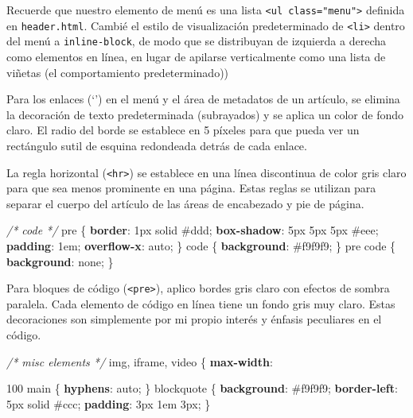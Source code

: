 \documentclass[12pt,]{krantz}
\makeatletter
\newenvironment{Shaded}{\begin{snugshade}}{\end{snugshade}}
\newcommand{\CommentTok}[1]{\textcolor[rgb]{0.56,0.35,0.01}{\textit{#1}}}
\newcommand{\DecValTok}[1]{\textcolor[rgb]{0.00,0.00,0.81}{#1}}
\newcommand{\KeywordTok}[1]{\textcolor[rgb]{0.13,0.29,0.53}{\textbf{#1}}}
\newcommand{\NormalTok}[1]{#1}
\newenvironment{kframe}{%
\medskip{}
\setlength{\fboxsep}{.8em}
 \def\at@end@of@kframe{}%
 \ifinner\ifhmode%
  \def\at@end@of@kframe{\end{minipage}}%
  \begin{minipage}{\columnwidth}%
 \fi\fi%
 \def\FrameCommand##1{\hskip\@totalleftmargin \hskip-\fboxsep
 \colorbox{shadecolor}{##1}\hskip-\fboxsep
     \hskip-\linewidth \hskip-\@totalleftmargin \hskip\columnwidth}%
 \MakeFramed {\advance\hsize-\width
   \@totalleftmargin\z@ \linewidth\hsize
   \@setminipage}}%
 {\par\unskip\endMakeFramed%
 \at@end@of@kframe}
\renewenvironment{Shaded}{\begin{kframe}}{\end{kframe}}
\theoremstyle{definition}
\theoremstyle{definition}
\theoremstyle{definition}
\theoremstyle{remark}
\makeatother
\begin{document}
\begin{itemize}
  Recuerde que nuestro elemento de menú es una lista
  \texttt{\textless{}ul\ class="menu"\textgreater{}} definida en
  \texttt{header.html}. Cambié el estilo de visualización predeterminado
  de \texttt{\textless{}li\textgreater{}} dentro del menú a
  \texttt{inline-block}, de modo que se distribuyan de izquierda a
  derecha como elementos en línea, en lugar de apilarse verticalmente
  como una lista de viñetas (el comportamiento predeterminado))

  Para los enlaces (`') en el menú y el área de metadatos de un
  artículo, se elimina la decoración de texto predeterminada
  (subrayados) y se aplica un color de fondo claro. El radio del borde
  se establece en 5 píxeles para que pueda ver un rectángulo sutil de
  esquina redondeada detrás de cada enlace.

  La regla horizontal (\texttt{\textless{}hr\textgreater{}}) se
  establece en una línea discontinua de color gris claro para que sea
  menos prominente en una página. Estas reglas se utilizan para separar
  el cuerpo del artículo de las áreas de encabezado y pie de página.

\begin{Shaded}
\begin{Highlighting}[]
\CommentTok{/* code */}
\NormalTok{pre \{}
  \KeywordTok{border}\NormalTok{: }\DecValTok{1px} \DecValTok{solid} \DecValTok{#ddd}\NormalTok{;}
  \KeywordTok{box-shadow}\NormalTok{: }\DecValTok{5px} \DecValTok{5px} \DecValTok{5px} \DecValTok{#eee}\NormalTok{;}
  \KeywordTok{padding}\NormalTok{: }\DecValTok{1em}\NormalTok{;}
  \KeywordTok{overflow-x}\NormalTok{: }\DecValTok{auto}\NormalTok{;}
\NormalTok{\}}
\NormalTok{code \{ }\KeywordTok{background}\NormalTok{: }\DecValTok{#f9f9f9}\NormalTok{; \}}
\NormalTok{pre code \{ }\KeywordTok{background}\NormalTok{: }\DecValTok{none}\NormalTok{; \}}
\end{Highlighting}
\end{Shaded}

  Para bloques de código (\texttt{\textless{}pre\textgreater{}}), aplico
  bordes gris claro con efectos de sombra paralela. Cada elemento de
  código en línea tiene un fondo gris muy claro. Estas decoraciones son
  simplemente por mi propio interés y énfasis peculiares en el código.

\begin{Shaded}
\begin{Highlighting}[]
\CommentTok{/* misc elements */}
\NormalTok{img, iframe, video \{ }\KeywordTok{max-width}\NormalTok{: }\DecValTok{100%
\NormalTok{main \{ }\KeywordTok{hyphens}\NormalTok{: }\DecValTok{auto}\NormalTok{; \}}
\NormalTok{blockquote \{}
  \KeywordTok{background}\NormalTok{: }\DecValTok{#f9f9f9}\NormalTok{;}
  \KeywordTok{border-left}\NormalTok{: }\DecValTok{5px} \DecValTok{solid} \DecValTok{#ccc}\NormalTok{;}
  \KeywordTok{padding}\NormalTok{: }\DecValTok{3px} \DecValTok{1em} \DecValTok{3px}\NormalTok{;}
\NormalTok{\}}

}
\end{Highlighting}
\end{Shaded}
\end{itemize}
\end{document}
